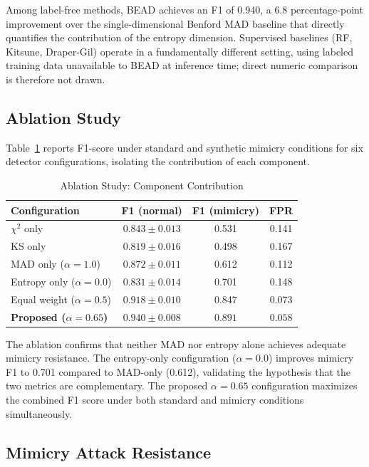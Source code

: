 \documentclass[conference]{IEEEtran}
\begin{document}
Among label-free methods, BEAD achieves an F1 of 0.940, a 6.8
percentage-point improvement over the single-dimensional Benford MAD
baseline that directly quantifies the contribution of the entropy
dimension. Supervised baselines (RF, Kitsune, Draper-Gil) operate in a
fundamentally different setting, using labeled training data unavailable
to BEAD at inference time; direct numeric comparison is therefore not
drawn.

\subsection{Ablation Study}
\label{sec:ablation}

Table~\ref{tab:ablation} reports F1-score under standard and synthetic
mimicry conditions for six detector configurations, isolating the
contribution of each component.

\begin{table}[t]
\caption{Ablation Study: Component Contribution}
\label{tab:ablation}
\centering
\setlength{\tabcolsep}{4pt}
\begin{tabular}{lccc}
\toprule
\textbf{Configuration} & \textbf{F1 (normal)} & \textbf{F1 (mimicry)} & \textbf{FPR} \\
\midrule
$\chi^2$ only              & $0.843{\pm}0.013$ & 0.531 & 0.141 \\
KS only                    & $0.819{\pm}0.016$ & 0.498 & 0.167 \\
MAD only ($\alpha=1.0$)    & $0.872{\pm}0.011$ & 0.612 & 0.112 \\
Entropy only ($\alpha=0.0$)& $0.831{\pm}0.014$ & 0.701 & 0.148 \\
Equal weight ($\alpha=0.5$)& $0.918{\pm}0.010$ & 0.847 & 0.073 \\
\textbf{Proposed ($\alpha=0.65$)} & $\mathbf{0.940{\pm}0.008}$ & $\mathbf{0.891}$ & $\mathbf{0.058}$ \\
\bottomrule
\end{tabular}
\end{table}

The ablation confirms that neither MAD nor entropy alone achieves adequate
mimicry resistance. The entropy-only configuration ($\alpha=0.0$) improves
mimicry F1 to 0.701 compared to MAD-only (0.612), validating the hypothesis
that the two metrics are complementary. The proposed $\alpha=0.65$
configuration maximizes the combined F1 score under both standard and
mimicry conditions simultaneously.

\subsection{Mimicry Attack Resistance}
\end{document}
